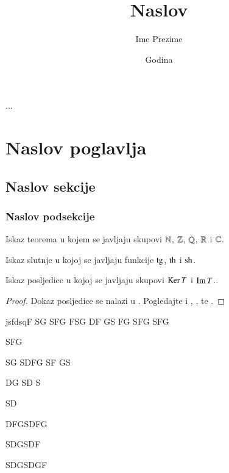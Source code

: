 \documentclass[a4paper,twoside,12pt]{memoir} %
\title{Naslov}
\author{Ime Prezime}
\date{Godina}  %
\begin{document}
\frontmatter


\begin{intro}
...
\end{intro}

\chapter[Naslov poglavlja u sadržaju][Kratki naslov poglavlja]{Naslov poglavlja}	

\section[Naslov sekcije u sadržaju][Kratki naslov sekcije]{Naslov sekcije}
\subsection{Naslov podsekcije}
\begin{thm}
Iskaz teorema u kojem se javljaju skupovi  $\mathbb{N}$, $\mathbb{Z}$, $\mathbb{Q}$, $\mathbb{R}$ i $\mathbb{C}$.
\end{thm}
\begin{conj}
Iskaz slutnje u kojoj se javljaju funkcije $\operatorname{tg}$, $\operatorname{th}$ i $\operatorname{sh}$.
\end{conj}
\begin{cor}
Iskaz posljedice u kojoj se javljaju skupovi $\operatorname{Ker} T$ i $\operatorname{Im} T$..
\end{cor}
\begin{proof}
Dokaz posljedice se nalazi u \cite{kljuc}. Pogledajte i \cite{kurepa1956convex}, \cite{kurepa1981funkcionalna}, \cite{folland} te \cite{Dutkay:2009}.
\end{proof}
jsfdsqF
SG
SFG
FSG
DF
GS
FG
SFG
SFG

SFG

SG
SDFG
SF
GS

DG
 SD
S


SD
 

DFGSDFG


SDGSDF


SDGSDGF
\end{document}
